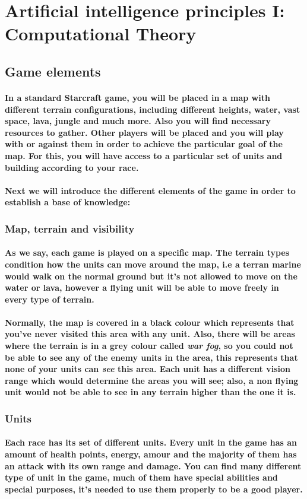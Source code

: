 \documentclass[a4paper,10pt]{article}
\newcommand{\p}[1]{\paragraph{\indent\textnormal{#1}}}
\begin{document}
\newpage
\section{Artificial intelligence principles I: Computational Theory}

  \subsection{Game elements}

    \p{In a standard Starcraft game, you will be placed in a map with different terrain configurations, including different heights, water, vast space, lava, jungle and much more. Also you will find necessary resources to gather. Other players will be placed and you will play with or against them in order to achieve the particular goal of the map. For this, you will have access to a particular set of units and building according to your race.}

    \p{Next we will introduce the different elements of the game in order to \textbf{establish a base of knowledge}:}

    \subsubsection{Map, terrain and visibility}

      \p{As we say, each game is played on a specific map. The terrain types condition how the units can move around the map, i.e a terran marine would walk on the normal ground but it's not allowed to move on the water or lava, however a flying unit will be able to move freely in every type of terrain.}

      \p{Normally, the map is covered in a black colour which represents that you've never visited this area with any unit. Also, there will be areas where the terrain is in a grey colour called \textit{war fog}, so you could not be able to see any of the enemy units in the area, this represents that none of your units can \textit{see} this area. Each unit has a different \textbf{vision range} which would determine the areas you will see; also, a non flying unit would not be able to see in any terrain higher than the one it is.}


    \subsubsection{Units}

      \p{Each race has its set of different units. Every unit in the game has an amount of health points, energy, amour and the majority of them has an attack with its own range and damage. You can find many different type of unit in the game, much of them have special abilities and special purposes, it's needed to use them properly to be a good player.}
\end{document}
